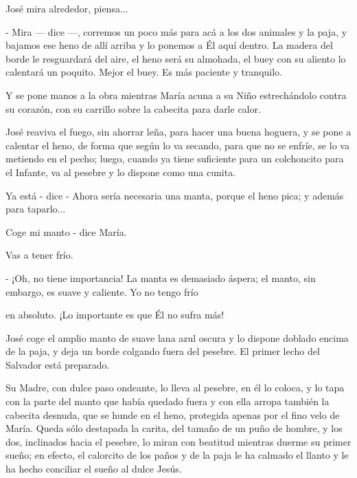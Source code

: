 \documentclass[12pt, twoside, openright]{book} %
\begin{document}
José mira alrededor, piensa... 

- Mira — dice —, corremos un poco más para acá a los dos animales y la paja, y bajamos ese heno de allí arriba y lo ponemos a Él aquí dentro. La madera del borde le resguardará del aire, el heno será su almohada, el buey con su aliento lo calentará un poquito. Mejor el buey. Es más paciente y tranquilo. 

Y se pone manos a la obra mientras María acuna a su Niño estrechándolo contra su corazón, con su carrillo sobre la cabecita para darle calor. 

José reaviva el fuego, sin ahorrar leña, para hacer una buena hoguera, y se pone a calentar el heno, de forma que según lo va secando, para que no se enfríe, se lo va metiendo en el pecho; luego, cuando ya tiene suficiente para un colchoncito para el Infante, va al pesebre y lo dispone como una cunita. 

Ya está - dice - Ahora sería necesaria una manta, porque el heno pica; y además para taparlo... 

Coge mi manto - dice María. 

Vas a tener frío. 

- ¡Oh, no tiene importancia! La manta es demasiado áspera; el manto, sin embargo, es suave y caliente. Yo no tengo frío 

en absoluto. ¡Lo importante es que Él no sufra más! 

José coge el amplio manto de suave lana azul oscura y lo dispone doblado encima de la paja, y deja un borde colgando fuera del pesebre. El primer lecho del Salvador está preparado. 

Su Madre, con dulce paso ondeante, lo lleva al pesebre, en él lo coloca, y lo tapa con la parte del manto que había quedado fuera y con ella arropa también la cabecita desnuda, que se hunde en el heno, protegida apenas por el fino velo de María. Queda sólo destapada la carita, del tamaño de un puño de hombre, y los dos, inclinados hacia el pesebre, lo miran con beatitud mientras duerme su primer sueño; en efecto, el calorcito de los paños y de la paja le ha calmado el llanto y le ha hecho conciliar el sueño al dulce Jesús. 
\end{document}
